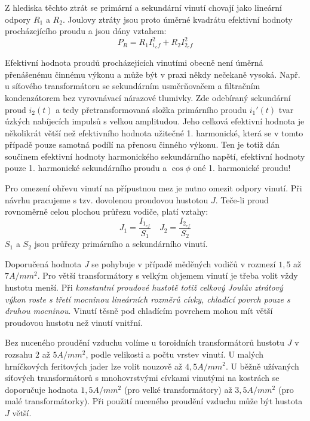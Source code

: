 {      Z hlediska těchto ztrát se primární a sekundární vinutí chovají jako lineární odpory $R_1$ a 
      $R_2$. Joulovy ztráty jsou proto úměrné kvadrátu efektivní hodnoty procházejícího proudu a 
      jsou dány vztahem:
      \begin{equation}\label{es_joul_loss}
        P_R= R_1 I_{1_ef}^2 + R_2 I_{2_ef}^2
      \end{equation}

      Efektivní hodnota proudů procházejících vinutími obecně není úměrná přenášenému činnému 
      výkonu a může být v praxi někdy nečekaně vysoká. Např. u síťového transformátoru se 
      sekundárním usměrňovačem a filtračním kondenzátorem bez vyrovnávací nárazové tlumivky. Zde 
      odebíraný sekundární proud $i_2(t)$ a tedy přetransformovaná složka primárního proudu 
      $i_1'(t)$ tvar úzkých nabíjecích impulsů s velkou amplitudou. Jeho celková efektivní hodnota 
      je několikrát větší než efektivního hodnota užitečné 1. harmonické, která se v tomto případě 
      pouze samotná podílí na přenosu činného výkonu. Ten je totiž dán součinem efektivní hodnoty 
      harmonického sekundárního napětí, efektivní hodnoty pouze 1. harmonické sekundárního proudu a 
      $\cos\phi$ oné 1. harmonické proudu!

      Pro omezení ohřevu vinutí na přípustnou mez je nutno omezit odpory vinutí. Při návrhu 
      pracujeme s tzv. dovolenou proudovou hustotou $J$. Teče-li proud rovno\-měr\-ně celou plochou 
      průřezu vodiče, platí vztahy:
      \begin{equation}\label{es_proud_hustota}
        J_1=\frac{I_{1_{ef}}}{S_1} \quad J_2=\frac{I_{2_{ef}}}{S_2}
      \end{equation}
      $S_1$ a $S_2$ jsou průřezy primárního  a sekundárního vinutí.

      Doporučená hodnota $J$ se pohybuje v případě měděných vodičů v rozmezí $1,5$ až $7 A/mm^2$. 
      Pro větší transformátory s velkým objemem vinutí je třeba volit vždy hustotu menší. Při 
      \emph{konstantní proudové hustotě totiž celkový Joulův ztrátový výkon roste s třetí mocninou 
      lineárních rozměrů cívky, chladící povrch pouze s druhou mocninou}. Vinutí těsně pod 
      chladícím povrchem mohou mít větší proudovou hustotu než vinutí vnitřní.

      Bez nuceného proudění vzduchu volíme u toroidních transformátorů hustotu $J$ v rozsahu $2$ až
      $5 A/mm^2$, podle velikosti a počtu vrstev vinutí. U malých hrníčkových feritových jader lze 
      volit nouzově až $4,5 A/mm^2$. U běžně užívaných síťových transformátorů s mnohovrstvými 
      cívkami vinutými na kostrách se doporučuje hodnota $1,5 A/mm^2$ (pro velké transformátory) až 
      $3,5 A/mm^2$ (pro malé transformátorky). Při použití nuceného proudění vzduchu může být 
      hustota $J$ větší.

}
